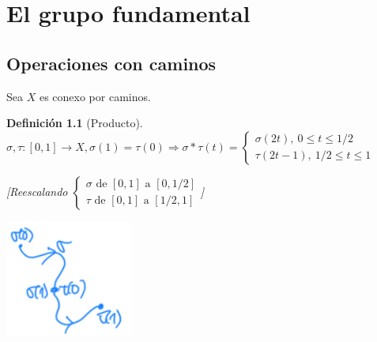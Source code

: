 \documentclass[10pt,a4paper,openright]{book}
\theoremstyle{break}
\newtheorem*{defi}{Definición}
\begin{document}
\chapter{El grupo fundamental}%
\label{cha:el_grupo_fundamental}
\section{Operaciones con caminos}%
\label{sec:operaciones_con_caminos}
Sea $X$ es conexo por caminos.
\begin{defi}[Producto]
$\sigma, \tau: \left[ 0, 1 \right] \rightarrow X, \sigma\left( 1 \right) = \tau\left( 0 \right) \Rightarrow \sigma * \tau\left( t \right) = \begin{cases}
    \sigma\left( 2 t \right),\ 0 \le t \le 1/2\\
    \tau\left( 2t - 1 \right),\ 1/2 \le t \le 1
\end{cases}$

[Reescalando $\begin{cases}
    \sigma \text{ de } \left[ 0, 1 \right] \text{ a } \left[ 0, 1/2 \right]\\
    \tau \text{ de } \left[ 0, 1 \right] \text{ a } \left[ 1/2, 1 \right] 
\end{cases}$]

\begin{center}
    \includegraphics[scale=0.3]{images/prod_grupo_fundamental} 
\end{center}
\end{defi}
\end{document}
